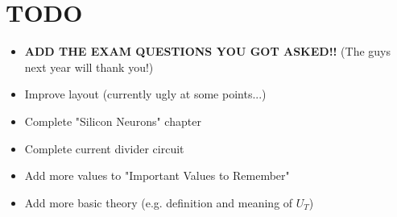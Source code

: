 \documentclass[report]{subfiles}
\begin{document}
\section{TODO}
\begin{itemize}
\item \textbf{ADD THE EXAM QUESTIONS YOU GOT ASKED!!} (The guys next year will thank you!)
\item Improve layout (currently ugly at some points...)
\item Complete "Silicon Neurons" chapter
\item Complete current divider circuit
\item Add more values to "Important Values to Remember"
\item Add more basic theory (e.g. definition and meaning of $U_T$)
\end{itemize}
\newpage
\end{document}
